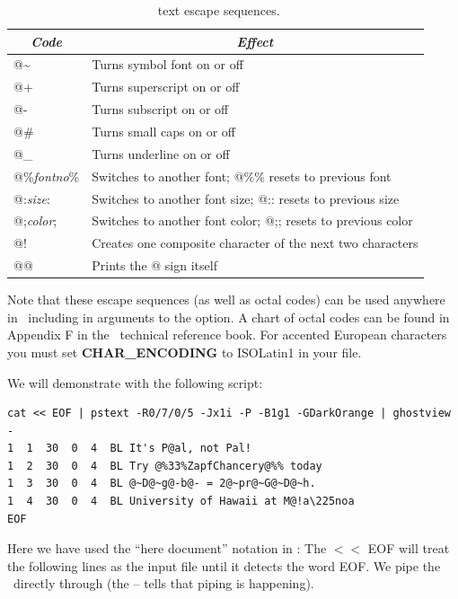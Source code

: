 \documentclass{report}
\begin{document}
\begin{table}[h]
\small
\centering
\begin{tabular}{|l|l|} \hline
\multicolumn{1}{|c|}{\emph{Code}}       &       \multicolumn{1}{c|}{\emph{Effect}} \\ \hline
@\~	&	Turns symbol font on or off \\ \hline 
@+	&	Turns superscript on or off \\ \hline 
@-	&	Turns subscript on or off \\ \hline 
@\#	&	Turns small caps on or off \\ \hline 
@\_	&	Turns underline on or off \\ \hline 
@\%\emph{fontno}\%	&	Switches to another font; @\%\% resets to previous font \\ \hline 
@:\emph{size}:	&	Switches to another font size; @:: resets to previous size \\ \hline 
@;\emph{color};	&	Switches to another font color; @;; resets to previous color \\ \hline 
@!	&	Creates one composite character of the next two characters \\ \hline 
@@	&	Prints the @ sign itself \\ \hline 
\end{tabular}
\caption{\gmt\ text escape sequences.}
\label{tbl:escape}
\end{table}

Note that these escape sequences (as well as octal codes) can be
used anywhere in \GMT\, including in arguments to the  option.
A chart of octal codes can be found in Appendix F in the \GMT\
technical reference book.  For accented European characters you must
set {\bf CHAR\_ENCODING} to ISOLatin1 in your  file.

We will demonstrate  with the following script:

{\small\begin{verbatim} 
cat << EOF | pstext -R0/7/0/5 -Jx1i -P -B1g1 -GDarkOrange | ghostview -
1  1  30  0  4  BL It's P@al, not Pal!
1  2  30  0  4  BL Try @%33%ZapfChancery@%% today
1  3  30  0  4  BL @~D@~g@-b@- = 2@~pr@~G@~D@~h.
1  4  30  0  4  BL University of Hawaii at M@!a\225noa
EOF
\end{verbatim}
}


Here we have used the ``here document'' notation in \UNIX: The $<$$<$ EOF
will treat the following lines as the input file until it detects the
word EOF.  We pipe the \PS\ directly through  (the -- tells
\progname{ghostview} that piping is happening).
\end{document}
